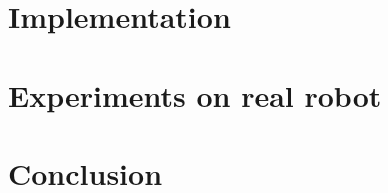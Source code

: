 \documentclass[twoside]{ctuthesis}
\theoremstyle{plain}
\theoremstyle{definition}
\theoremstyle{note}
\begin{document}



\chapter{Implementation}



\chapter{Experiments on real robot}



\chapter{Conclusion}


\appendix

\printindex

\appendix




\end{document}
